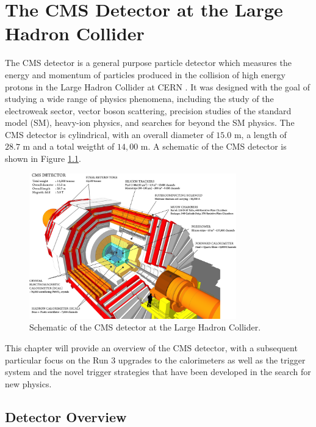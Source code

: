 \chapter{The CMS Detector at the Large Hadron Collider}

The CMS detector is a general purpose particle detector which measures the energy and momentum of particles produced in the collision of high energy protons in the Large Hadron Collider at CERN \cite{collaborationCMSExperimentCERN2008}. It was designed with the goal of studying a wide range of physics phenomena, including the study of the electroweak sector, vector boson scattering, precision studies of the standard model (SM), heavy-ion physics, and searches for beyond the SM physics. The CMS detector is cylindrical, with an overall diameter of $15.0 \text{ m}$, a length of $28.7 \text{ m}$ and a total weigtht of $14,00\text{ m}$. A schematic of the CMS detector is shown in Figure \ref{fig:cms_detector}.

\begin{figure}[ht]
	\centering
	\includegraphics[width=0.8\textwidth]{images/cms_detector.png}
	\caption{Schematic of the CMS detector at the Large Hadron Collider.}
	\label{fig:cms_detector}
\end{figure}

This chapter will provide an overview of the CMS detector, with a subsequent particular focus on the Run 3 upgrades to the calorimeters as well as the trigger system and the novel trigger strategies that have been developed in the search for new physics.

\section{Detector Overview}




